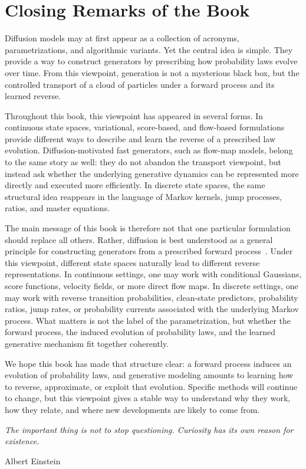 \clearpage
\newpage

\section{Closing Remarks of the Book}\label{sec:epilogue-closing}
Diffusion models may at first appear as a collection of acronyms, parametrizations, and algorithmic variants. Yet the central idea is simple. They provide a way to construct generators by prescribing how probability laws evolve over time. From this viewpoint, generation is not a mysterious black box, but the controlled transport of a cloud of particles under a forward process and its learned reverse.

Throughout this book, this viewpoint has appeared in several forms. In continuous state spaces, variational, score-based, and flow-based formulations provide different ways to describe and learn the reverse of a prescribed law evolution. Diffusion-motivated fast generators, such as flow-map models, belong to the same story as well: they do not abandon the transport viewpoint, but instead ask whether the underlying generative dynamics can be represented more directly and executed more efficiently. In discrete state spaces, the same structural idea reappears in the language of Markov kernels, jump processes, ratios, and master equations.

The main message of this book is therefore not that one particular formulation should replace all others. Rather, diffusion is best understood as a general principle for constructing generators from a prescribed forward process~\citep{lai2026unified}. Under this viewpoint, different state spaces naturally lead to different reverse representations. In continuous settings, one may work with conditional Gaussians, score functions, velocity fields, or more direct flow maps. In discrete settings, one may work with reverse transition probabilities, clean-state predictors, probability ratios, jump rates, or probability currents associated with the underlying Markov process. What matters is not the label of the parametrization, but whether the forward process, the induced evolution of probability laws, and the learned generative mechanism fit together coherently.

We hope this book has made that structure clear: a forward process induces an evolution of probability laws, and generative modeling amounts to learning how to reverse, approximate, or exploit that evolution. Specific methods will continue to change, but this viewpoint gives a stable way to understand why they work, how they relate, and where new developments are likely to come from.

\epigraph{\textit{The important thing is not to stop questioning. Curiosity has its own reason for existence.}}{Albert Einstein}
